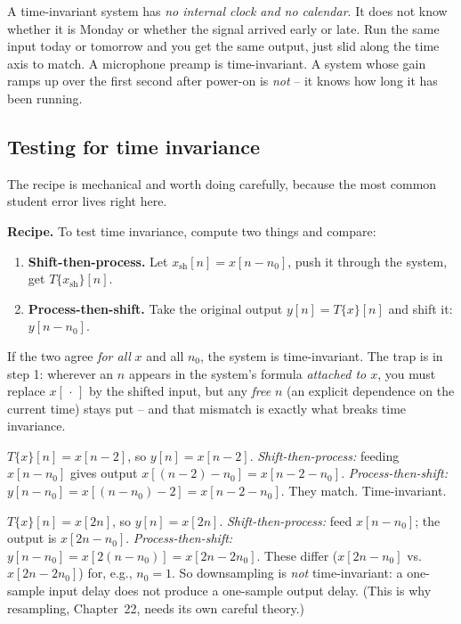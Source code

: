 \begin{intuitionbox}
A time-invariant system has \emph{no internal clock and no calendar}. It does not
know whether it is Monday or whether the signal arrived early or late. Run the
same input today or tomorrow and you get the same output, just slid along the
time axis to match. A microphone preamp is time-invariant. A system whose gain
ramps up over the first second after power-on is \emph{not} -- it knows how long
it has been running.
\end{intuitionbox}

\subsection*{Testing for time invariance}

The recipe is mechanical and worth doing carefully, because the most common
student error lives right here.

\begin{walkbox}
\textbf{Recipe.} To test time invariance, compute two things and compare:
\begin{enumerate}
  \item \textbf{Shift-then-process.} Let $x_{\text{sh}}[n] = x[n-n_0]$, push it
        through the system, get $T\{x_{\text{sh}}\}[n]$.
  \item \textbf{Process-then-shift.} Take the original output
        $y[n] = T\{x\}[n]$ and shift it: $y[n-n_0]$.
\end{enumerate}
If the two agree \emph{for all} $x$ and all $n_0$, the system is time-invariant.
The trap is in step 1: wherever an $n$ appears in the system's formula
\emph{attached to $x$}, you must replace $x[\,\cdot\,]$ by the shifted input,
but any \emph{free} $n$ (an explicit dependence on the current time) stays put --
and that mismatch is exactly what breaks time invariance.
\end{walkbox}

\begin{example}
$T\{x\}[n] = x[n-2]$, so $y[n] = x[n-2]$.
\emph{Shift-then-process:} feeding $x[n-n_0]$ gives output $x[(n-2)-n_0] =
x[n-2-n_0]$.
\emph{Process-then-shift:} $y[n-n_0] = x[(n-n_0)-2] = x[n-2-n_0]$.
They match. Time-invariant. \checkmark
\end{example}

\begin{example}
\label{ch12:downsampler}
$T\{x\}[n] = x[2n]$, so $y[n] = x[2n]$.
\emph{Shift-then-process:} feed $x[n-n_0]$; the output is $x[2n - n_0]$.
\emph{Process-then-shift:} $y[n-n_0] = x[2(n-n_0)] = x[2n - 2n_0]$.
These differ ($x[2n-n_0]$ vs.\ $x[2n-2n_0]$) for, e.g., $n_0=1$. So
downsampling is \emph{not} time-invariant: a one-sample input delay does not
produce a one-sample output delay. (This is why resampling, Chapter~22, needs
its own careful theory.)
\end{example}

